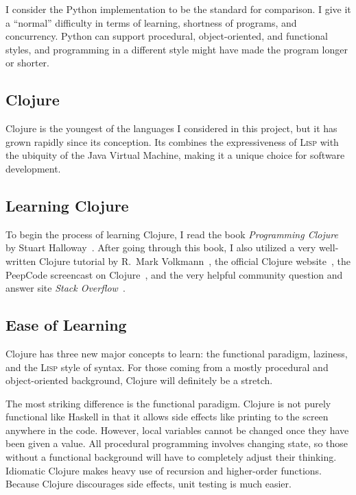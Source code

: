 \documentclass{article}
\begin{document}
I consider the Python implementation to be the standard for comparison.  I give
it a ``normal'' difficulty in terms of learning, shortness of programs, and
concurrency.  Python can support procedural, object-oriented, and functional
styles, and programming in a different style might have made the program longer
or shorter.

\subsection{Clojure}

Clojure is the youngest of the languages I considered in this project, but it
has grown rapidly since its conception.  Its combines the expressiveness of
\textsc{Lisp} with the ubiquity of the Java Virtual Machine, making it a unique
choice for software development.

\subsection{Learning Clojure}

To begin the process of learning Clojure, I read the book \emph{Programming
Clojure} by Stuart Halloway~\cite{clojurebook}.  After going through this book,
I also utilized a very well-written Clojure tutorial by R.~Mark
Volkmann~\cite{clojuretutorial}, the official Clojure
website~\cite{clojuredotorg}, the PeepCode screencast on
Clojure~\cite{peepcodeclojure}, and the very helpful community question and answer
site \emph{Stack Overflow}~\cite{stackoverflow}.

\subsection{Ease of Learning}

Clojure has three new major concepts to learn: the functional paradigm,
laziness, and the \textsc{Lisp} style of syntax. For those coming from a mostly
procedural and object-oriented background, Clojure will definitely be a stretch.

The most striking difference is the functional paradigm.  Clojure is not purely
functional like Haskell in that it allows side effects like printing to the
screen anywhere in the code.  However, local variables cannot be changed once
they have been given a value.  All procedural programming involves changing
state, so those without a functional background will have to completely adjust
their thinking.  Idiomatic Clojure makes heavy use of recursion and higher-order
functions.  Because Clojure discourages side effects, unit testing is much
easier.
\end{document}
